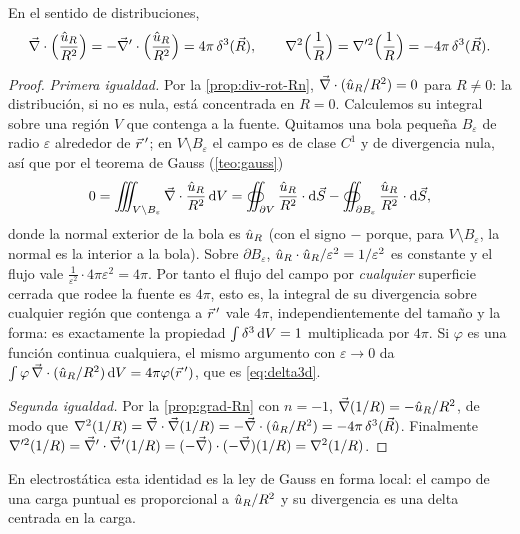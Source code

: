 \begin{teorema}\label{teo:delta}
En el sentido de distribuciones,
\begin{equation}\label{eq:delta-div}
  \vec{\nabla}\cdot\Bigl(\frac{\hat{u}_{R}}{R^{2}}\Bigr)=-\vec{\nabla}'\cdot\Bigl(\frac{\hat{u}_{R}}{R^{2}}\Bigr)=4\pi\,\delta^{3}(\vec{R}),
  \qquad
  \nabla^{2}\Bigl(\frac{1}{R}\Bigr)=\nabla'^{2}\Bigl(\frac{1}{R}\Bigr)=-4\pi\,\delta^{3}(\vec{R}).
\end{equation}
\end{teorema}
\begin{proof}
\emph{Primera igualdad.} Por la \cref{prop:div-rot-Rn}, $\vec{\nabla}\cdot(\hat{u}_{R}/R^{2})=0$ para
$R\neq0$: la distribución, si no es nula, está concentrada en $R=0$. Calculemos
su integral sobre una región $V$ que contenga a la fuente. Quitamos una bola
pequeña $B_\varepsilon$ de radio $\varepsilon$ alrededor de $\vec{r}\,'$; en
$V\setminus B_\varepsilon$ el campo es de clase $C^{1}$ y de divergencia nula, así
que por el teorema de Gauss (\cref{teo:gauss})
\[
  0=\iiint_{V\setminus B_\varepsilon}\vec{\nabla}\cdot\frac{\hat{u}_{R}}{R^{2}}\,\mathrm{d} V
   =\oiint_{\partial V}\frac{\hat{u}_{R}}{R^{2}}\cdot\mathrm{d}\vec{S}-\oiint_{\partial B_\varepsilon}\frac{\hat{u}_{R}}{R^{2}}\cdot\mathrm{d}\vec{S} ,
\]
donde la normal exterior de la bola es $\hat{u}_{R}$ (con el signo $-$ porque, para
$V\setminus B_\varepsilon$, la normal es la interior a la bola). Sobre
$\partial B_\varepsilon$, $\hat{u}_{R}\cdot\hat{u}_{R}/\varepsilon^{2}=1/\varepsilon^{2}$ es constante y
el flujo vale $\tfrac{1}{\varepsilon^{2}}\cdot4\pi\varepsilon^{2}=4\pi$. Por tanto
el flujo del campo por \emph{cualquier} superficie cerrada que rodee la fuente
es $4\pi$, esto es, la integral de su divergencia sobre cualquier región que
contenga a $\vec{r}\,'$ vale $4\pi$, independientemente del tamaño y la forma: es
exactamente la propiedad $\int\delta^{3}\,\mathrm{d} V=1$ multiplicada por $4\pi$.
Si $\varphi$ es una función continua cualquiera, el mismo argumento con
$\varepsilon\to0$ da $\int\varphi\,\vec{\nabla}\cdot(\hat{u}_{R}/R^{2})\,\mathrm{d} V=4\pi\varphi(\vec{r}\,')$, que es
\eqref{eq:delta3d}.

\emph{Segunda igualdad.} Por la \cref{prop:grad-Rn} con $n=-1$,
$\vec{\nabla}(1/R)=-\hat{u}_{R}/R^{2}$, de modo que $\nabla^{2}(1/R)=\vec{\nabla}\cdot\vec{\nabla}(1/R)=-\vec{\nabla}\cdot(\hat{u}_{R}/R^{2})=-4\pi\,\delta^{3}(\vec{R})$.
Finalmente $\nabla'^{2}(1/R)=\vec{\nabla}'\cdot\vec{\nabla}'(1/R)=(-\vec{\nabla})\cdot(-\vec{\nabla})(1/R)=\nabla^{2}(1/R)$.
\end{proof}

En electrostática esta identidad es la ley de Gauss en forma local: el campo de
una carga puntual es proporcional a $\hat{u}_{R}/R^{2}$ y su divergencia es una delta
centrada en la carga.

